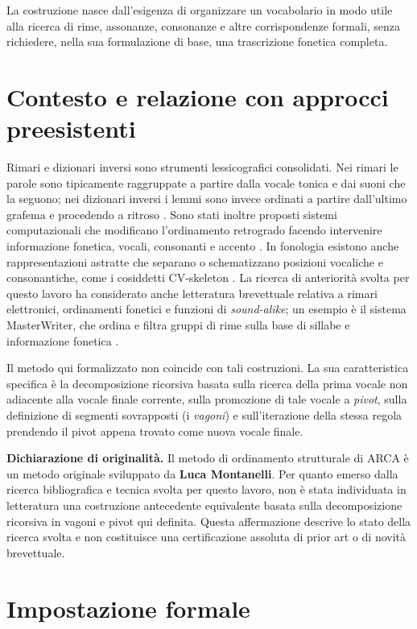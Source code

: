 \documentclass[11pt,a4paper]{article}
\theoremstyle{definition}
\theoremstyle{remark}
\begin{document}
La costruzione nasce dall'esigenza di organizzare un vocabolario in modo utile alla ricerca di rime, assonanze, consonanze e altre corrispondenze formali, senza richiedere, nella sua formulazione di base, una trascrizione fonetica completa.

\section{Contesto e relazione con approcci preesistenti}

Rimari e dizionari inversi sono strumenti lessicografici consolidati. Nei rimari le parole sono tipicamente raggruppate a partire dalla vocale tonica e dai suoni che la seguono; nei dizionari inversi i lemmi sono invece ordinati a partire dall'ultimo grafema e procedendo a ritroso \cite{crifo2011}. Sono stati inoltre proposti sistemi computazionali che modificano l'ordinamento retrogrado facendo intervenire informazione fonetica, vocali, consonanti e accento \cite{byrdchodorow1985}. In fonologia esistono anche rappresentazioni astratte che separano o schematizzano posizioni vocaliche e consonantiche, come i cosiddetti CV-skeleton \cite{boudelaa2004}. La ricerca di anteriorità svolta per questo lavoro ha considerato anche letteratura brevettuale relativa a rimari elettronici, ordinamenti fonetici e funzioni di \emph{sound-alike}; un esempio è il sistema MasterWriter, che ordina e filtra gruppi di rime sulla base di sillabe e informazione fonetica \cite{masterwriter2005}.

Il metodo qui formalizzato non coincide con tali costruzioni. La sua caratteristica specifica è la decomposizione ricorsiva basata sulla ricerca della prima vocale non adiacente alla vocale finale corrente, sulla promozione di tale vocale a \emph{pivot}, sulla definizione di segmenti sovrapposti (i \emph{vagoni}) e sull'iterazione della stessa regola prendendo il pivot appena trovato come nuova vocale finale.

\medskip
\noindent\textbf{Dichiarazione di originalità.} Il metodo di ordinamento strutturale di ARCA è un metodo originale sviluppato da \textbf{Luca Montanelli}. Per quanto emerso dalla ricerca bibliografica e tecnica svolta per questo lavoro, non è stata individuata in letteratura una costruzione antecedente equivalente basata sulla decomposizione ricorsiva in vagoni e pivot qui definita. Questa affermazione descrive lo stato della ricerca svolta e non costituisce una certificazione assoluta di prior art o di novità brevettuale.

\section{Impostazione formale}
\end{document}
